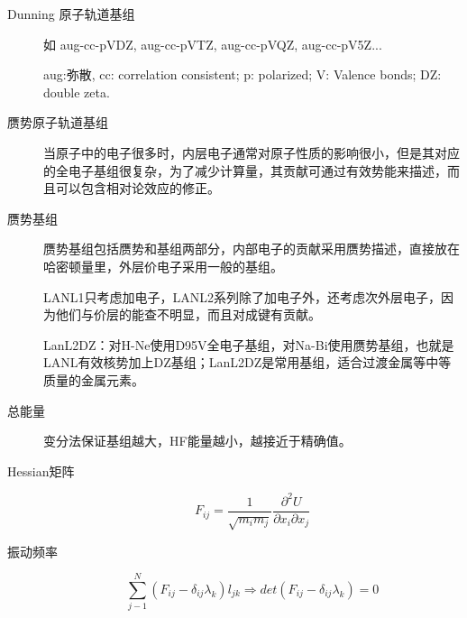 \documentclass[12pt,a4paper,openany,twoside]{book}
\numberwithin{equation}{section}
\begin{document}
  \begin{description}
    \item[Dunning 原子轨道基组] 如 aug-cc-pVDZ, aug-cc-pVTZ, aug-cc-pVQZ, aug-cc-pV5Z...
  
    aug:弥散, cc: correlation consistent; p: polarized; V: Valence bonds; DZ: double zeta.
  
    \item[赝势原子轨道基组] 当原子中的电子很多时，内层电子通常对原子性质的影响很小，但是其对应的全电子基组很复杂，为了减少计算量，其贡献可通过有效势能来描述，而且可以包含相对论效应的修正。
  
    \item[赝势基组]
    赝势基组包括赝势和基组两部分，内部电子的贡献采用赝势描述，直接放在哈密顿量里，外层价电子采用一般的基组。
  
    LANL1只考虑加电子，LANL2系列除了加电子外，还考虑次外层电子，因为他们与价层的能查不明显，而且对成键有贡献。
  
    LanL2DZ：对H-Ne使用D95V全电子基组，对Na-Bi使用赝势基组，也就是LANL有效核势加上DZ基组；LanL2DZ是常用基组，适合过渡金属等中等质量的金属元素。
  
    \item[总能量] 变分法保证基组越大，HF能量越小，越接近于精确值。
  
    \item[Hessian矩阵]
    \begin{equation}
    F_{ij}=\frac{1}{\sqrt{m_im_j}}\frac{\partial^2 U}{\partial x_i \partial x_j}
    \end{equation}
  
    \item[振动频率]
    \begin{equation}
    \sum_{j-1}^N (F_{ij}-\delta_{ij}\lambda_k)l_{jk}\Rightarrow det(F_{ij}-\delta_{ij}\lambda_{k})=0
    \end{equation}
  \end{description}
  
\end{document}
